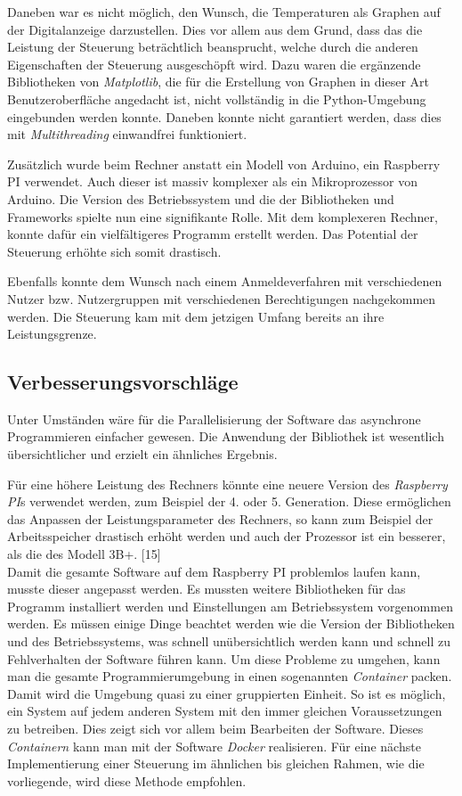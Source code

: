 Daneben war es nicht möglich, den Wunsch, die Temperaturen als Graphen auf der Digitalanzeige darzustellen. Dies vor allem aus dem Grund, dass das die Leistung der Steuerung beträchtlich beansprucht, welche durch die anderen Eigenschaften der Steuerung ausgeschöpft wird. Dazu waren die ergänzende Bibliotheken  von \textit{Matplotlib}, die für die Erstellung von Graphen in dieser Art Benutzeroberfläche angedacht ist, nicht vollständig in die Python-Umgebung eingebunden werden konnte. Daneben konnte nicht garantiert werden, dass dies mit \textit{Multithreading} einwandfrei funktioniert. 

Zusätzlich wurde beim Rechner anstatt ein Modell von Arduino, ein Raspberry PI verwendet. Auch dieser ist massiv komplexer als ein Mikroprozessor von Arduino. Die Version des Betriebssystem und die der Bibliotheken und Frameworks spielte nun eine signifikante Rolle. Mit dem komplexeren Rechner, konnte dafür ein vielfältigeres Programm erstellt werden. Das Potential der Steuerung erhöhte sich somit drastisch.

Ebenfalls konnte dem Wunsch nach einem Anmeldeverfahren mit verschiedenen Nutzer bzw. Nutzergruppen mit verschiedenen Berechtigungen nachgekommen werden. Die Steuerung kam mit dem jetzigen Umfang bereits an ihre Leistungsgrenze.

\subsection{Verbesserungsvorschläge}
Unter Umständen wäre für die Parallelisierung der Software das asynchrone Programmieren einfacher gewesen. Die Anwendung der Bibliothek ist wesentlich übersichtlicher und erzielt ein ähnliches Ergebnis.

Für eine höhere Leistung des Rechners könnte eine neuere Version des \textit{Raspberry PI}s verwendet werden, zum Beispiel der 4. oder 5. Generation. Diese ermöglichen das Anpassen der Leistungsparameter des Rechners, so kann zum Beispiel der Arbeitsspeicher drastisch erhöht werden und auch der Prozessor ist ein besserer, als die des Modell 3B+. [15]\\

Damit die gesamte Software auf dem Raspberry PI problemlos laufen kann, musste dieser angepasst werden. Es mussten weitere Bibliotheken für das Programm installiert werden und Einstellungen am Betriebssystem vorgenommen werden. Es müssen einige Dinge beachtet werden wie die Version der Bibliotheken und des Betriebssystems, was schnell unübersichtlich werden kann und schnell zu Fehlverhalten der Software führen kann. Um diese Probleme zu umgehen, kann man die gesamte Programmierumgebung in einen sogenannten \textit{Container} packen. Damit wird die Umgebung quasi zu einer gruppierten Einheit. So ist es möglich, ein System auf jedem anderen System mit den immer gleichen Voraussetzungen zu betreiben. Dies zeigt sich vor allem beim Bearbeiten der Software. Dieses \textit{Containern} kann man mit der Software \textit{Docker} realisieren. Für eine nächste Implementierung einer Steuerung im ähnlichen bis gleichen Rahmen, wie die vorliegende, wird diese Methode empfohlen.